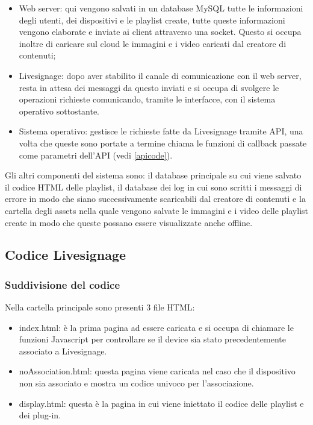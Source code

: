 \begin{itemize}
    \item Web server: qui vengono salvati in un database MySQL tutte le informazioni degli utenti, dei dispositivi e le playlist create, tutte queste informazioni vengono elaborate e inviate ai client attraverso una socket. Questo si occupa inoltre di caricare sul cloud le immagini e i video caricati dal creatore di contenuti;
    \item Livesignage: dopo aver stabilito il canale di comunicazione con il web server, resta in attesa dei messaggi da questo inviati e si occupa di svolgere le operazioni richieste comunicando, tramite le interfacce, con il sistema operativo sottostante.
    \item Sistema operativo: gestisce le richieste fatte da Livesignage tramite API, una volta che queste sono portate a termine chiama le funzioni di callback passate come parametri dell'API (vedi \ref*{apicode}).
\end{itemize}

Gli altri componenti del sistema sono: il database principale su cui viene salvato il codice HTML delle playlist, il database dei log in cui sono scritti i messaggi di errore in modo che siano successivamente scaricabili dal creatore di contenuti e la cartella degli assets nella quale vengono salvate le immagini e i video delle playlist create in modo che queste possano essere visualizzate anche offline.

\subsection{Codice Livesignage}

\subsubsection{Suddivisione del codice}

Nella cartella principale sono presenti 3 file HTML: 
\begin{itemize}
    \item index.html: è la prima pagina ad essere caricata e si occupa di chiamare le funzioni Javascript per controllare se il device sia stato precedentemente associato a Livesignage.
    \item noAssociation.html: questa pagina viene caricata nel caso che il dispositivo non sia associato e mostra un codice univoco per l'associazione.
    \item display.html: questa è la pagina in cui viene iniettato il codice delle playlist e dei plug-in.
\end{itemize}

